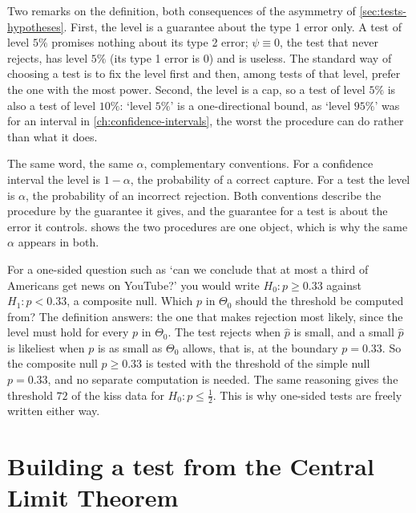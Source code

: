 Two remarks on the definition, both consequences of the asymmetry of \cref{sec:tests-hypotheses}.
First, the level is a guarantee about the type 1 error only.
A test of level $5\%$ promises nothing about its type 2 error; $\psi \equiv 0$, the test that never rejects, has level $5\%$ (its type 1 error is $0$) and is useless.
The standard way of choosing a test is to fix the level first and then, among tests of that level, prefer the one with the most power.
Second, the level is a cap, so a test of level $5\%$ is also a test of level $10\%$: `level $5\%$' is a one-directional bound, as `level $95\%$' was for an interval in \cref{ch:confidence-intervals}, the worst the procedure can do rather than what it does.

\begin{pitfall}
The same word, the same $\alpha$, complementary conventions.
For a confidence interval the level is $1 - \alpha$, the probability of a correct capture.
For a test the level is $\alpha$, the probability of an incorrect rejection.
Both conventions describe the procedure by the guarantee it gives, and the guarantee for a test is about the error it controls.
 shows the two procedures are one object, which is why the same $\alpha$ appears in both.
\end{pitfall}

\begin{intuition}
For a one-sided question such as `can we conclude that at most a third of Americans get news on YouTube?' you would write $H_0: p \geq 0.33$ against $H_1: p < 0.33$, a composite null. Which $p$ in $\Theta_0$ should the threshold be computed from?
The definition answers: the one that makes rejection most likely, since the level must hold for every $p$ in $\Theta_0$.
The test rejects when $\hat{p}$ is small, and a small $\hat{p}$ is likeliest when $p$ is as small as $\Theta_0$ allows, that is, at the boundary $p = 0.33$.
So the composite null $p \geq 0.33$ is tested with the threshold of the simple null $p = 0.33$, and no separate computation is needed.
The same reasoning gives the threshold $72$ of the kiss data for $H_0: p \leq \frac12$.
This is why one-sided tests are freely written either way.
\end{intuition}

\section{Building a test from the Central Limit Theorem}
\label{sec:tests-clt}

